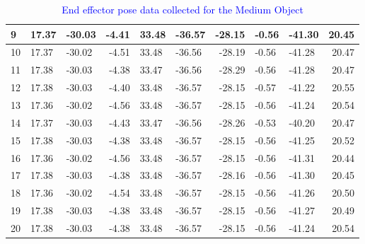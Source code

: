 \begin{table}[]
\begin{tabular}{|l|l|l|r|l|l|r|l|l|r|}
9                                                        & 17.37           & -30.03           & -4.41                     & 33.48  & -36.57 & -28.15           & -0.56  & -41.30  & 20.45            \\ \hline
10                                                       & 17.37           & -30.02           & -4.51                     & 33.48  & -36.56 & -28.19           & -0.56  & -41.28  & 20.47            \\ \hline
11                                                       & 17.38           & -30.03           & -4.38                     & 33.47  & -36.56 & -28.29           & -0.56  & -41.28  & 20.47            \\ \hline
12                                                       & 17.38           & -30.03           & -4.40                     & 33.48  & -36.57 & -28.15           & -0.57  & -41.22  & 20.55            \\ \hline
13                                                       & 17.36           & -30.02           & -4.56                     & 33.48  & -36.57 & -28.15           & -0.56  & -41.24  & 20.54            \\ \hline
14                                                       & 17.37           & -30.03           & -4.43                     & 33.47  & -36.56 & -28.26           & -0.53  & -40.20  & 20.47            \\ \hline
15                                                       & 17.38           & -30.03           & -4.38                     & 33.48  & -36.57 & -28.15           & -0.56  & -41.25  & 20.52            \\ \hline
16                                                       & 17.36           & -30.02           & -4.56                     & 33.48  & -36.57 & -28.15           & -0.56  & -41.31  & 20.44            \\ \hline
17                                                       & 17.38           & -30.03           & -4.38                     & 33.48  & -36.57 & -28.16           & -0.56  & -41.30  & 20.45            \\ \hline
18                                                       & 17.36           & -30.02           & -4.54                     & 33.48  & -36.57 & -28.15           & -0.56  & -41.26  & 20.50            \\ \hline
19                                                       & 17.38           & -30.03           & -4.38                     & 33.48  & -36.57 & -28.15           & -0.56  & -41.27  & 20.49            \\ \hline
20                                                       & 17.38           & -30.03           & -4.38                     & 33.48  & -36.57 & -28.15           & -0.56  & -41.24  & 20.54            \\ \hline
\end{tabular}
\caption{\textcolor{blue}{End effector pose data collected for the Medium Object}}
\label{tab:ee-medium-object}
\end{table}



